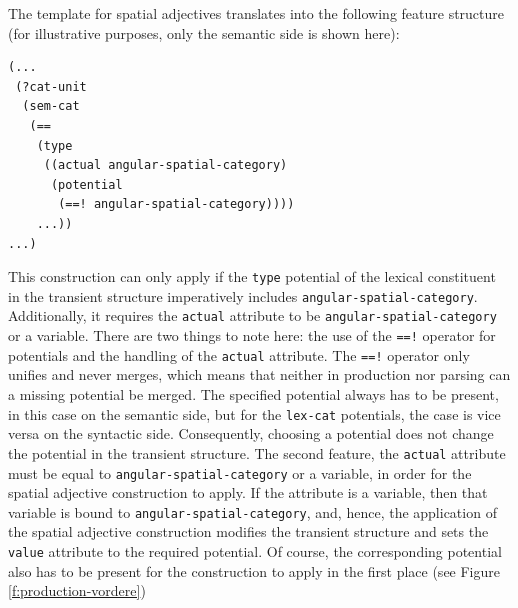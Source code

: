 The template for spatial adjectives translates into the following 
feature structure (for illustrative purposes, only the semantic 
side is shown here):
\begin{example}
\label{e:def-fun-spatial-adjective-potentials}
\begin{footnotesize}
\begin{Verbatim}[commandchars=\\\{\}]
(...
 (?cat-unit
  (sem-cat 
   (== 
    (type
     ((actual angular-spatial-category)
      (potential 
       (==! angular-spatial-category))))
    ...))
...)
\end{Verbatim}
\end{footnotesize}
\end{example}
This construction can only apply if the {\footnotesize\tt type} potential 
of the lexical constituent in the transient structure imperatively includes 
{\footnotesize\tt angular-spatial-category}. Additionally,
it requires the {\footnotesize\tt actual} attribute
to be {\footnotesize\tt angular-spatial-category} or a variable. There are two
things to note here: the use of the {\footnotesize\tt ==!} operator for 
potentials and the handling of the {\footnotesize\tt actual} attribute. 
The {\footnotesize\tt ==!} operator only unifies and never merges, 
which means that neither in production nor parsing can a missing 
potential be merged. The specified potential always has to be present, 
in this case on the semantic side, but for the {\footnotesize\tt lex-cat} 
potentials, the case is vice versa on the 
syntactic side. Consequently, choosing a potential does not 
change the potential in the transient structure. 
The second feature, the {\footnotesize\tt actual} attribute must be equal 
to {\footnotesize\tt angular-spatial-category} or a variable, in order for the spatial 
adjective construction to apply. If the attribute
is a variable, then that variable is bound to {\footnotesize\tt angular-spatial-category}, 
and, hence, the application of the spatial adjective construction 
modifies the transient structure and sets the {\footnotesize\tt value} attribute 
to the required potential. Of course, the corresponding potential also 
has to be present for the construction to
apply in the first place (see Figure \ref{f:production-vordere})

